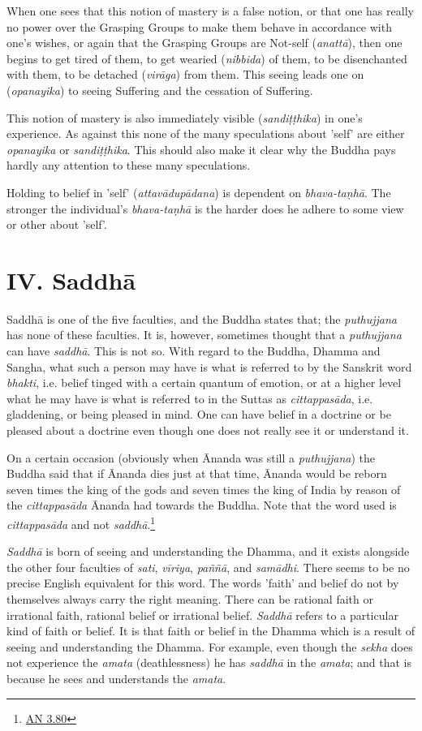 When one sees that this notion of mastery is a false notion, or that one
has really no power over the Grasping Groups to make them behave in
accordance with one’s wishes, or again that the Grasping Groups are
Not-self (\emph{anattā}), then one begins to get tired of them, to get
wearied (\emph{nibbida}) of them, to be disenchanted with them, to be
detached (\emph{virāga}) from them. This seeing leads one on
(\emph{opanayika}) to seeing Suffering and the cessation of Suffering.


This notion of mastery is also immediately visible (\emph{sandiṭṭhika}) in
one’s experience. As against this none of the many speculations about
'self' are either \emph{opanayika} or \emph{sandiṭṭhika}. This should also make
it clear why the Buddha pays hardly any attention to these many
speculations.


Holding to belief in 'self' (\emph{attavādupādana}) is dependent on
\emph{bhava-taṇhā}. The stronger the individual’s \emph{bhava-taṇhā} is the
harder does he adhere to some view or other about 'self'.


\hypertarget{x-iv.-saddhā}{\section*{IV. Saddhā}}
Saddhā is one of the five faculties, and the Buddha states that; the
\emph{puthujjana} has none of these faculties. It is, however, sometimes thought that
a \emph{puthujjana} can have \emph{saddhā}. This is not so. With regard to the Buddha,
Dhamma and Sangha, what such a person may have is what is referred to by the
Sanskrit word \emph{bhakti}, i.e. belief tinged with a certain quantum of emotion, or
at a higher level what he may have is what is referred to in the Suttas as
\emph{cittappasāda}, i.e. gladdening, or being pleased in mind. One can have belief
in a doctrine or be pleased about a doctrine even though one does not really see
it or understand it.


On a certain occasion (obviously when Ānanda was still a \emph{puthujjana})
the Buddha said that if Ānanda dies just at that time, Ānanda would
be reborn seven times the king of the gods and seven times the king of
India by reason of the \emph{cittappasāda} Ānanda had towards the Buddha. Note
that the word used is \emph{cittappasāda} and not \emph{saddhā}.\footnote{\href{https://suttacentral.net/an3.80/en/sujato}{AN 3.80}}


\emph{Saddhā} is born of seeing and understanding the Dhamma, and it exists
alongside the other four faculties of \emph{sati}, \emph{vīriya}, \emph{paññā}, and \emph{samādhi}.
There seems to be no precise English equivalent for this word. The words
'faith' and belief do not by themselves always carry the right meaning.
There can be rational faith or irrational faith, rational belief or
irrational belief. \emph{Saddhā} refers to a particular kind of faith or
belief. It is that faith or belief in the Dhamma which is a result of
seeing and understanding the Dhamma. For example, even though the
\emph{sekha} does not experience the \emph{amata} (deathlessness) he has \emph{saddhā} in the
\emph{amata}; and that is because he sees and understands the \emph{amata}.


